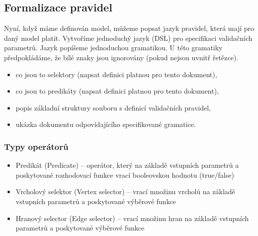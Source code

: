 
\subsection{Formalizace pravidel}
\label{design-rules_formalization}
Nyní, když máme definován model, můžeme popsat jazyk pravidel, která mají pro daný model platit. Vytvoříme jednoduchý jazyk (DSL) pro specifikaci validačních parametrů. Jazyk popíšeme jednoduchou gramatikou. U této gramatiky předpokládáme, že bílé znaky jsou ignorovány (pokud nejsou uvnitř řetězce).


\begin{itemize}
\item co jsou to selektory (napsat definici platnou pro tento dokument),
\item co jsou to predikáty (napsat definici platnou pro tento dokument),
\item popis základní struktury souboru s definicí validačních pravidel,
\item ukázka dokumentu odpovídajícího specifikované gramatice.
\end{itemize}

\subsubsection{Typy operátorů}
\begin{itemize}
\item Predikát (Predicate) -- operátor, který na základě vstupních parametrů a poskytované rozhodovací funkce vrací booleovskou hodnotu (true/false)
\item Vrcholový selektor (Vertex selector) -- vrací množinu vrcholů na základě vstupních parametrů a poskytované výběrové funkce
\item Hranový selector (Edge selector) -- vrací množinu hran na základě vstupních parametrů a poskytované výběrové funkce
\end{itemize}

